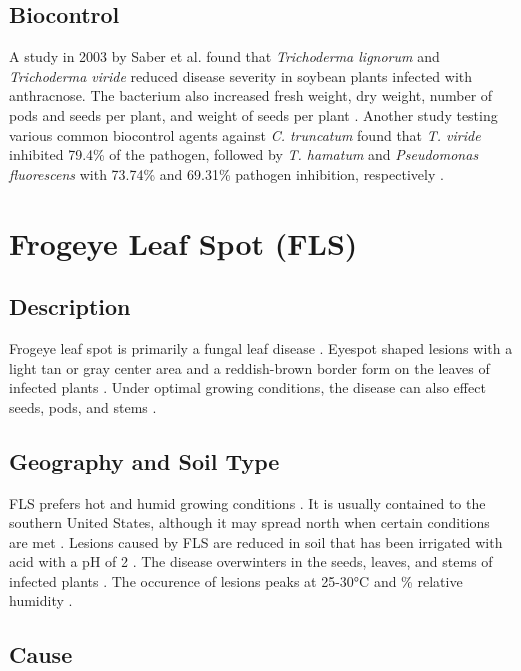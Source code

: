 \documentclass[letterpaper, 12pt]{report}
\begin{document}
\subsection{Biocontrol}

A study in 2003 by Saber et al. found that \emph{Trichoderma lignorum} and \emph{Trichoderma viride} reduced disease severity in soybean plants infected with anthracnose. The bacterium also increased fresh weight, dry weight, number of pods and seeds per plant, and weight of seeds per plant \autocite{saber2003biocontrol}. Another study testing various common biocontrol agents against \emph{C. truncatum} found that \emph{T. viride} inhibited 79.4\% of the pathogen, followed by \emph{T. hamatum} and \emph{Pseudomonas fluorescens} with 73.74\% and 69.31\% pathogen inhibition, respectively \autocite{jagtap2012control}.


\section[Frogeye Leaf Spot]{Frogeye Leaf Spot (FLS)}

\subsection{Description}

Frogeye leaf spot is primarily a fungal leaf disease \autocite{dunleavy1966soybean}. Eyespot shaped lesions with a light tan or gray center area and a reddish-brown border form on the leaves of infected plants \autocite{dunleavy1966soybean}. Under optimal growing conditions, the disease can also effect seeds, pods, and stems \autocite{mian2008frogeye}.

\subsection{Geography and Soil Type}

FLS prefers hot and humid growing conditions \autocite{mian2008frogeye}. It is usually contained to the southern United States, although it may spread north when certain conditions are met \autocite{dunleavy1966soybean}. Lesions caused by FLS are reduced in soil that has been irrigated with acid with a pH of 2 \autocite{walker1994effects}. The disease overwinters in the seeds, leaves, and stems of infected plants \autocite{dunleavy1966soybean}. The occurence of lesions peaks at 25-30°C and \% relative humidity \autocite{mian2008frogeye}.

\subsection{Cause}
\end{document}
